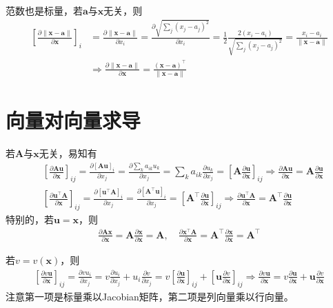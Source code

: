 \documentclass{ctexart}
\theoremstyle{definition}
\def \av {\bm{a}}
\def \uv {\bm{u}}
\def \xv {\bm{x}}
\def \Av {\mathbf{A}}
\begin{document}
范数也是标量，若$\av$与$\xv$无关，则
\begin{align*}
    \left[ \frac{\partial \| \xv - \av \|}{\partial \xv} \right]_i & = \frac{\partial \| \xv - \av \|}{\partial x_i} = \frac{\partial \sqrt{\sum_j (x_j - a_j)^2}}{\partial x_i} = \frac{1}{2} \frac{2 (x_i - a_i)}{\sqrt{\sum_j (x_j - a_j)^2}} = \frac{x_i - a_i}{\| \xv - \av \|} \\
                                                                   & \Longrightarrow \frac{\partial \| \xv - \av \|}{\partial \xv} = \frac{(\xv - \av)^\top}{\| \xv - \av \|}
\end{align*}


\section{向量对向量求导}

若$\Av$与$\xv$无关，易知有
\begin{align*}
     & \left[ \frac{\partial \Av \uv}{\partial \xv} \right]_{ij} = \frac{\partial [\Av \uv]_i}{\partial x_j} = \frac{\partial \sum_k a_{ik} u_k}{\partial x_j} = \sum_k a_{ik} \frac{\partial u_k}{\partial x_j} = \left[ \Av \frac{\partial \uv}{\partial \xv} \right]_{ij} \Longrightarrow \frac{\partial \Av \uv}{\partial \xv} = \Av \frac{\partial \uv}{\partial \xv} \\
     & \left[ \frac{\partial \uv^\top \Av}{\partial \xv} \right]_{ij} = \frac{\partial [\uv^\top \Av]_i}{\partial x_j} = \frac{\partial [\Av^\top \uv]_i}{\partial x_j} = \left[ \Av^\top \frac{\partial \uv}{\partial \xv} \right]_{ij} \Longrightarrow \frac{\partial \uv^\top \Av}{\partial \xv} = \Av^\top \frac{\partial \uv}{\partial \xv}
\end{align*}
特别的，若$\uv = \xv$，则
\begin{align*}
    \frac{\partial \Av \xv}{\partial \xv} = \Av \frac{\partial \xv}{\partial \xv} = \Av, \quad \frac{\partial \xv^\top \Av}{\partial \xv} = \Av^\top \frac{\partial \xv}{\partial \xv} = \Av^\top
\end{align*}

若$v = v(\xv)$，则
\begin{align*}
    \left[ \frac{\partial v \uv}{\partial \xv} \right]_{ij} = \frac{\partial v u_i}{\partial x_j} = v \frac{\partial u_i}{\partial x_j} + u_i \frac{\partial v}{\partial x_j} = v \left[ \frac{\partial \uv}{\partial \xv} \right]_{ij} + \left[ \uv \frac{\partial v}{\partial \xv} \right]_{ij} \Longrightarrow \frac{\partial v \uv}{\partial \xv} = v \frac{\partial \uv}{\partial \xv} + \uv \frac{\partial v}{\partial \xv}
\end{align*}
注意第一项是标量乘以Jacobian矩阵，第二项是列向量乘以行向量。
\end{document}
